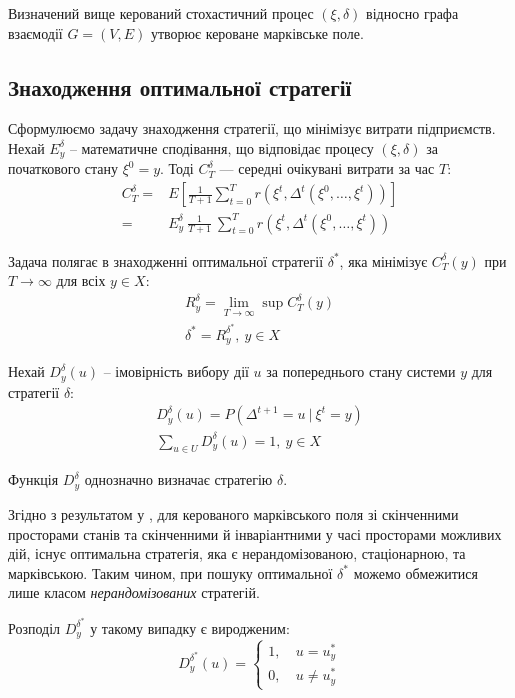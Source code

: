 \documentclass[oneside,14pt]{extarticle}
\begin{document}
Визначений вище керований стохастичний процес \((\xi, \delta)\) відносно графа взаємодії \(G = (V, E)\) утворює кероване марківське поле.








\subsection{Знаходження оптимальної стратегії}

Сформулюємо задачу знаходження стратегії, що мінімізує витрати підприємств. Нехай \(E_y^\delta\) – математичне сподівання, що відповідає процесу \((\xi, \delta)\) за початкового стану \(\xi^0 = y\).  Тоді \(C_T^\delta\) — середні очікувані витрати за час \(T\):
\begin{align*}
C_T^{\delta} = &E\left[\frac{1}{T+1}\sum_{t=0}^T r(\xi^t, \Delta^t(\xi^0, \ldots, \xi^t))\right] \\
 = &E_y^\delta\ \frac{1}{T+1}\ \sum_{t=0}^T r(\xi^t, \Delta^t(\xi^0, \ldots, \xi^t))
\end{align*}

Задача полягає в знаходженні оптимальної стратегії \(\delta^*\), яка мінімізує \(C_T^{\delta}(y)\) при \(T\rightarrow\infty\) для всіх \(y \in X\):
\begin{gather*}
R_y^\delta = \lim\limits_{T \rightarrow \infty} \sup C_T^{\delta}(y) \\
\delta^* = R_y^{\delta^*},\ y \in X
\end{gather*}

Нехай \(D_y^{\delta}(u)\) – імовірність вибору дії \(u\) за попереднього стану системи \(y\) для стратегії \(\delta\):
\begin{gather*}
D_y^{\delta}(u) = P(\Delta^{t+1} = u\ |\ \xi^t = y) \\ \sum_{u \in U} D_y^\delta(u) = 1,\ y \in X
\end{gather*}

Функція \(D_y^\delta\) однозначно визначає стратегію \(\delta\).

Згідно з результатом у \cite{Chornei:2005}, для керованого марківського поля зі скінченними просторами станів та скінченними й інваріантними у часі просторами можливих дій, існує оптимальна стратегія, яка є нерандомізованою, стаціонарною, та марківською. Таким чином, при пошуку оптимальної \(\delta^*\) можемо обмежитися лише класом \textit{нерандомізованих} стратегій.

Розподіл \(D_y^{\delta^*}\) у такому випадку є виродженим:
\[D_y^{\delta^*}(u) = \begin{cases}
1,&\ u = u_y^* \\
0,&\ u \neq u_y^*
\end{cases}
\]
\end{document}
